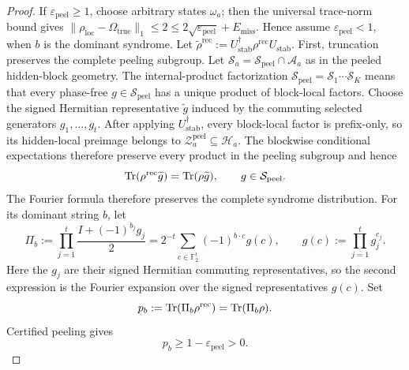 \documentclass[
  aps,
  prx,
  reprint,
  superscriptaddress,
  amsmath,
  amssymb,
  nofootinbib,
  longbibliography
]{revtex4-2}
\newcommand{\Fc}{\mathbb{F}_2}
\begin{document}
\begin{proof}
If $\varepsilon_{\mathrm{peel}}\ge1$, choose arbitrary states $\omega_a$;
then the universal trace-norm bound gives
$\|\rho_{\mathrm{loc}}-\Omega_{\mathrm{true}}\|_1\le2
\le2\sqrt{\varepsilon_{\mathrm{peel}}}+E_{\mathrm{miss}}$.
Hence assume $\varepsilon_{\mathrm{peel}}<1$, when $b$ is the dominant
syndrome.
Let $\tilde\rho^{\mathrm{rec}}
:=
U_{\mathrm{stab}}^\dagger\rho^{\mathrm{rec}}U_{\mathrm{stab}}$. 
First, truncation preserves the complete peeling subgroup.  Let
$\mathcal S_a=\mathcal S_{\mathrm{peel}}\cap\mathcal A_a$ as in the
peeled hidden-block geometry.  The internal-product factorization
$\mathcal S_{\mathrm{peel}}=\mathcal S_1\cdots\mathcal S_K$ means that
every phase-free $g\in\mathcal S_{\mathrm{peel}}$ has a unique product
of block-local factors.  Choose the signed Hermitian representative
$\widetilde g$ induced by the commuting selected generators
$g_1,\dots,g_t$.  After applying $U_{\mathrm{stab}}^\dagger$, every
block-local factor is prefix-only, so its hidden-local preimage belongs
to $\mathcal Z_a^{\mathrm{peel}}\subseteq\mathcal H_a$.  The blockwise
conditional expectations therefore preserve every product in the
peeling subgroup and hence
\begin{equation}
\Tr(\rho^{\mathrm{rec}}\widetilde g)
=
\Tr(\rho\widetilde g),
\qquad
g\in\mathcal S_{\mathrm{peel}}.
\label{eq:supp-full-peeling-subgroup-moment-preservation}
\end{equation}
The Fourier formula therefore preserves the complete syndrome distribution.
For its dominant string $b$, let
\begin{equation}
\Pi_b
:=
\prod_{j=1}^t
\frac{I+(-1)^{b_j}g_j}{2}
=
2^{-t}
\sum_{c\in\Fc^t}
(-1)^{b\cdot c}g(c),
\qquad
g(c):=\prod_{j=1}^tg_j^{c_j}.
\label{eq:supp-phase-safe-syndrome-projector}
\end{equation}
Here the $g_j$ are their signed Hermitian commuting representatives, so
the second expression is the Fourier expansion over the signed
representatives $g(c)$.  Set
\begin{equation}
p_b
:=
\Tr(\Pi_b\rho^{\mathrm{rec}})
=
\Tr(\Pi_b\rho).
\end{equation}
Certified peeling gives
\begin{equation}
p_b
\ge
1-\varepsilon_{\mathrm{peel}}
>
0.
\label{eq:supp-positive-compressed-syndrome-weight}
\end{equation}


\end{proof}
\end{document}
